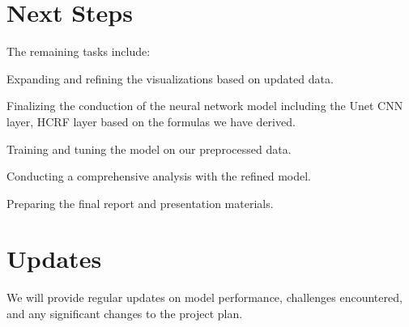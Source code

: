 \documentclass[10pt]{article}
\begin{document}
\section{Next Steps}


The remaining tasks include:
\begin{enumerate*}[label = (\roman*)]
\item Expanding and refining the visualizations based on updated data.
\item Finalizing the conduction of the neural network model including the Unet CNN layer, HCRF layer based on the formulas we have derived.
\item Training and tuning the model on our preprocessed data. 
\item Conducting a comprehensive analysis with the refined model.
\item Preparing the final report and presentation materials.
\end{enumerate*}


\section{Updates}


We will provide regular updates on model performance, challenges encountered,
and any significant changes to the project plan.




\end{document}
